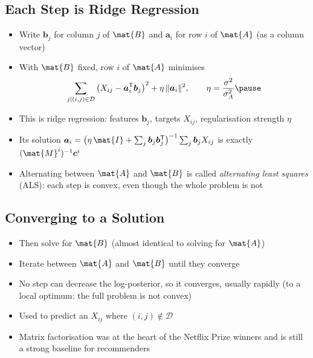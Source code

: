 \begin{slide}
\section[-2]{Each Step is Ridge Regression}

\begin{PauseHighLight}
  \begin{itemize}
  \item Write $\bm{b}_j$ for column $j$ of $\mat{B}$ and $\bm{a}_i$ for
    row $i$ of $\mat{A}$ (as a column vector)\pause
  \item With $\mat{B}$ fixed, row $i$ of $\mat{A}$ minimises
    \begin{align*}
      \sum_{j|(i,j)\in\mathcal{D}} \left(X_{ij} -
      \bm{a}_i^\tr\bm{b}_j\right)^2 + \eta\,\|\bm{a}_i\|^2, \qquad
      \eta = \frac{\sigma^2}{\sigma_A^2}\pause
    \end{align*}
  \item This is ridge regression: features $\bm{b}_j$, targets
    $X_{ij}$, regularisation strength $\eta$\pause
  \item Its solution $\bm{a}_i = \bigl(\eta\,\mat{I} + \sum_j
    \bm{b}_j\bm{b}_j^\tr\bigr)^{-1}\sum_j \bm{b}_j X_{ij}$ is exactly
    $(\mat{M}^i)^{-1}\bm{c}^i$\pause
  \item Alternating between $\mat{A}$ and $\mat{B}$ is called
    \emph{alternating least squares} (ALS)\pause{}: each step is
    convex, even though the whole problem is not\pause
  \end{itemize}
\end{PauseHighLight}

\end{slide}


\begin{slide}
\section{Converging to a Solution}

\begin{PauseHighLight}
  \begin{itemize}
  \item Then solve for $\mat{B}$ (almost identical to solving for
    $\mat{A}$)\pause
  \item Iterate between $\mat{A}$ and $\mat{B}$ until they
    converge\pause
  \item No step can decrease the log-posterior, so it converges,
    usually rapidly\pause{} (to a local optimum: the full problem is
    not convex)\pause
  \item Used to predict an $X_{ij}$ where $(i,j)\not\in\mathcal{D}$\pause
  \item Matrix factorisation was at the heart of the Netflix Prize
    winners and is still a strong baseline for recommenders\pause
  \end{itemize}
\end{PauseHighLight}

\end{slide}

